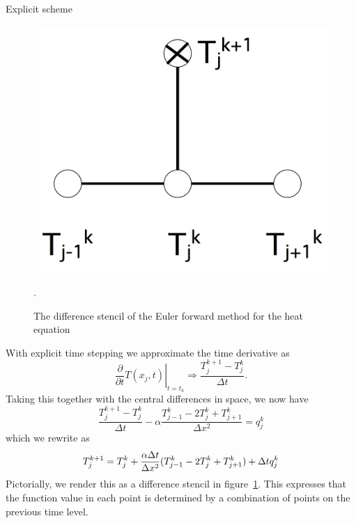  {Explicit scheme}
\label{fig:explicit-heat}

\begin{figure}
  \leavevmode\kern\unitindent 
  \includegraphics[scale=.12]{graphics/euler-forward}
  \caption{The difference stencil of the Euler forward method for the
    heat equation}
  \label{fig:Euler-forward-stencil}.
\end{figure}
%
With explicit time stepping we approximate the time derivative as
\begin{equation}
  \left.\frac\partial{\partial t}T(x_j,t)\right|_{t=t_k}
  \Rightarrow
  \frac{T_j^{k+1}-T_j^k}{\Delta t}.
  \label{eq:disc-time-explicit}
\end{equation}
Taking this together with the central differences in space, we now have
\[
  \frac{T_j^{k+1}-T_j^k}{\Delta t}-\alpha
  \frac{T_{j-1}^k-2T_j^k+T_{j+1}^k}{\Delta x^2}=q_j^k 
\]
which we rewrite as
\begin{equation}
  \label{eq:bivp-explicit}
  T_j^{k+1}=T_j^k+\frac{\alpha\Delta t}{\Delta x^2}
  (T_{j-1}^k-2T_j^k+T_{j+1}^k)+\Delta t q_j^k 
\end{equation}
Pictorially, we render this as a difference stencil in
figure~\ref{fig:Euler-forward-stencil}.
This expresses that the function value in each point is determined by
a combination of points on the previous time level.

